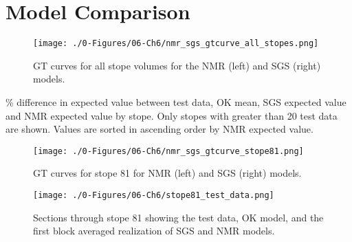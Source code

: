 \FloatBarrier
\section{Model Comparison}
\label{sec:compare}

\begin{figure}[htb!]
    \centering
    \texttt{[image: ./0-Figures/06-Ch6/nmr\_sgs\_gtcurve\_all\_stopes.png]}
    \caption{\Gls{GT} curves for all stope volumes for the \gls{NMR} (left) and \gls{SGS} (right) models. }
    \label{fig:nmr_sgs_gtcurve_all_stopes.png}
\end{figure}

\begin{table}[!htb]
    \centering
    \caption{\% difference in expected value between test data, \gls{OK} mean, \gls{SGS} expected value and \gls{NMR} expected value by stope. Only stopes with greater than 20 test data are shown. Values are sorted in ascending order by \gls{NMR} expected value.}
    \resizebox{0.9\width}{!}{}
    \label{tab:nmr_sgs_stope_delta.tex}
\end{table}


\begin{figure}[htb!]
    \centering
    \texttt{[image: ./0-Figures/06-Ch6/nmr\_sgs\_gtcurve\_stope81.png]}
    \caption{\Gls{GT} curves for stope 81 for \gls{NMR} (left) and \gls{SGS} (right) models. }
    \label{fig:nmr_sgs_gtcurve_stope81.png}
\end{figure}

\begin{figure}[htb!]
    \centering
    \texttt{[image: ./0-Figures/06-Ch6/stope81\_test\_data.png]}
    \caption{Sections through stope 81 showing the test data, \gls{OK} model, and the first block averaged realization of \gls{SGS} and \gls{NMR} models.}
    \label{fig:stope81_test_data.png}
\end{figure}

